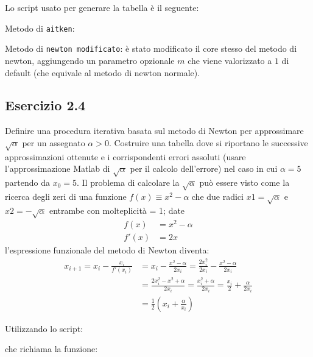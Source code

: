 Lo script usato per generare la tabella è il seguente:


Metodo di \lstinline{aitken}:


Metodo di \lstinline{newton modificato}: è stato modificato il core stesso del metodo di newton, aggiungendo un parametro opzionale $m$ che viene valorizzato a $1$ di default (che equivale al metodo di newton normale).



	\subsection{Esercizio 2.4}

Definire una procedura iterativa basata sul metodo di Newton per approssimare $\sqrt{\alpha}$ per un assegnato $\alpha > 0$. Costruire una tabella dove
si riportano le successive approssimazioni ottenute e i corrispondenti errori assoluti (usare l’approssimazione Matlab di $\sqrt{\alpha}$ per il calcolo dell'errore) nel caso in cui $\alpha = 5$ partendo da $x_0 = 5$.
\PP
Il problema di calcolare la $\sqrt{\alpha}$ può essere visto come la ricerca degli zeri di una funzione $f(x) \equiv x^2 - \alpha$ che due radici $x1=\sqrt{\alpha}$ e $x2= -\sqrt{\alpha}$ entrambe con molteplicità = 1; date
\begin{equation*}
	\begin{split}
		f(x) & = x^2 - \alpha \\
		f'(x) & = 2x
	\end{split}
\end{equation*}
l'espressione funzionale del metodo di Newton diventa:
\begin{equation*}
	\begin{split}
		x_{i+1} = x_i - \frac{x_i}{f'(x_i)} & = x_i - \frac{x^2-\alpha}{2x_i} = \frac{2x_i^2}{2x_i} - \frac{x^2-\alpha}{2x_i} \\
		& = \frac{2x_i^2 - x^2 + \alpha}{2x_i} = \frac{x_i^2+\alpha}{2x_i} = \frac{x_i}{2} + \frac{\alpha}{2x_i} \\
		& = \frac{1}{2}(x_i + \frac{\alpha}{x_i})
	\end{split}	
\end{equation*}

Utilizzando lo script:


che richiama la funzione:


